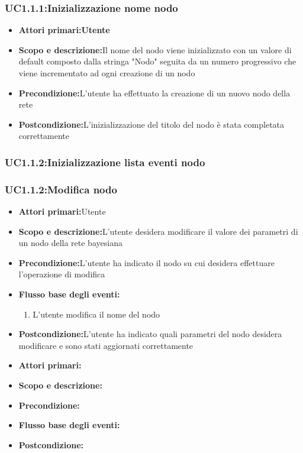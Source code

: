 \subsubsection{UC1.1.1:Inizializzazione nome nodo}
\begin{itemize}
	\item{\textbf{Attori primari:Utente}}
	\item{\textbf{Scopo e descrizione:}Il nome del nodo viene inizializzato con un valore di default composto dalla stringa "Nodo" seguita da un numero progressivo che viene incrementato ad ogni creazione di un nodo}
	\item{\textbf{Precondizione:}L'utente ha effettuato la creazione di un nuovo nodo della rete}
	\item{\textbf{Postcondizione:}L'inizializzazione del titolo del nodo è stata completata correttamente}
\end{itemize}
\subsubsection{UC1.1.2:Inizializzazione lista eventi nodo}
\subsubsection{UC1.1.2:Modifica nodo}
\begin{itemize}
	\item{\textbf{Attori primari:}Utente}
	\item{\textbf{Scopo e descrizione:}L'utente desidera modificare il valore dei parametri di un nodo della rete bayesiana}
	\item{\textbf{Precondizione:}L'utente ha indicato il nodo su cui desidera effettuare l'operazione di modifica}
	\item{\textbf{Flusso base degli eventi:}}
		\begin{enumerate}
			\item{L'utente modifica il nome del nodo}		
		\end{enumerate}
	\item{\textbf{Postcondizione:}L'utente ha indicato quali parametri del nodo desidera modificare e sono stati aggiornati correttamente}
\end{itemize}


\begin{itemize}
	\item{\textbf{Attori primari:}}
	\item{\textbf{Scopo e descrizione:}}
	\item{\textbf{Precondizione:}}
	\item{\textbf{Flusso base degli eventi:}}

	\item{\textbf{Postcondizione:}}
\end{itemize}
